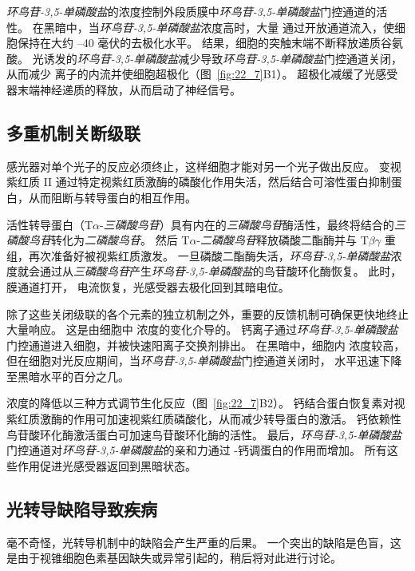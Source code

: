 \textit{环鸟苷-3,5-单磷酸盐}的浓度控制外段质膜中\textit{环鸟苷-3,5-单磷酸盐}门控通道的活性。
在黑暗中，当\textit{环鸟苷-3,5-单磷酸盐}浓度高时，大量  通过开放通道流入，使细胞保持在大约 –40 毫伏的去极化水平。
结果，细胞的突触末端不断释放递质谷氨酸。
光诱发的\textit{环鸟苷-3,5-单磷酸盐}减少导致\textit{环鸟苷-3,5-单磷酸盐}门控通道关闭，从而减少  离子的内流并使细胞超极化（图~\ref{fig:22_7}B1）。
超极化减缓了光感受器末端神经递质的释放，从而启动了神经信号。



\subsection{多重机制关断级联}

感光器对单个光子的反应必须终止，这样细胞才能对另一个光子做出反应。
变视紫红质 II 通过特定视紫红质激酶的磷酸化作用失活，然后结合可溶性蛋白抑制蛋白，从而阻断与转导蛋白的相互作用。


活性转导蛋白（T$\alpha$-\textit{三磷酸鸟苷}）具有内在的\textit{三磷酸鸟苷}酶活性，最终将结合的\textit{三磷酸鸟苷}转化为\textit{二磷酸鸟苷}。
然后 T$\alpha$-\textit{二磷酸鸟苷}释放磷酸二酯酶并与 T$\beta$$\gamma$ 重组，再次准备好被视紫红质激发。
一旦磷酸二酯酶失活，\textit{环鸟苷-3,5-单磷酸盐}浓度就会通过从\textit{三磷酸鸟苷}产生\textit{环鸟苷-3,5-单磷酸盐}的鸟苷酸环化酶恢复。
此时，膜通道打开， 电流恢复，光感受器去极化回到其暗电位。


除了这些关闭级联的各个元素的独立机制之外，重要的反馈机制可确保更快地终止大量响应。
这是由细胞中  浓度的变化介导的。
钙离子通过\textit{环鸟苷-3,5-单磷酸盐}门控通道进入细胞，并被快速阳离子交换剂排出。
在黑暗中，细胞内  浓度较高，但在细胞对光反应期间，当\textit{环鸟苷-3,5-单磷酸盐}门控通道关闭时， 水平迅速下降至黑暗水平的百分之几。


 浓度的降低以三种方式调节生化反应（图~\ref{fig:22_7}B2）。
钙结合蛋白恢复素对视紫红质激酶的作用可加速视紫红质磷酸化，从而减少转导蛋白的激活。
钙依赖性鸟苷酸环化酶激活蛋白可加速鸟苷酸环化酶的活性。
最后，\textit{环鸟苷-3,5-单磷酸盐}门控通道对\textit{环鸟苷-3,5-单磷酸盐}的亲和力通过 -钙调蛋白的作用而增加。
所有这些作用促进光感受器返回到黑暗状态。



\subsection{光转导缺陷导致疾病}

毫不奇怪，光转导机制中的缺陷会产生严重的后果。
一个突出的缺陷是色盲，这是由于视锥细胞色素基因缺失或异常引起的，稍后将对此进行讨论。


